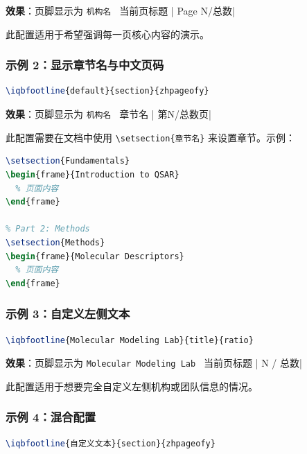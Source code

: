 \textbf{效果}：页脚显示为 \lstinline|机构名 | 当前页标题 | Page N/总数|

此配置适用于希望强调每一页核心内容的演示。

\subsubsection{示例 2：显示章节名与中文页码}

\begin{lstlisting}[style=blockstyle,language=TeX]
\iqbfootline{default}{section}{zhpageofy}
\end{lstlisting}

\textbf{效果}：页脚显示为 \lstinline|机构名 | 章节名 | 第N/总数页|

此配置需要在文档中使用 \lstinline|\setsection{章节名}| 来设置章节。示例：

\begin{lstlisting}[style=blockstyle,language=TeX]
% Part 1: Fundamentals
\setsection{Fundamentals}
\begin{frame}{Introduction to QSAR}
  % 页面内容
\end{frame}

% Part 2: Methods
\setsection{Methods}
\begin{frame}{Molecular Descriptors}
  % 页面内容
\end{frame}
\end{lstlisting}

\subsubsection{示例 3：自定义左侧文本}

\begin{lstlisting}[style=blockstyle,language=TeX]
\iqbfootline{Molecular Modeling Lab}{title}{ratio}
\end{lstlisting}

\textbf{效果}：页脚显示为 \lstinline|Molecular Modeling Lab | 当前页标题 | N / 总数|

此配置适用于想要完全自定义左侧机构或团队信息的情况。

\subsubsection{示例 4：混合配置}

\begin{lstlisting}[style=blockstyle,language=TeX]
\iqbfootline{自定义文本}{section}{zhpageofy}
\end{lstlisting}

